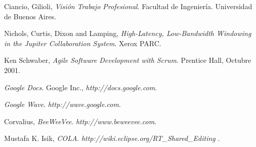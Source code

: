 \documentclass[12pt,a4paper]{article}
\begin{document}
\newpage
\begin{thebibliography}{9}
	Ciancio, Gilioli,
	\emph{Visión Trabajo Profesional}.
	Facultad de Ingeniería.
	Universidad de Buenos Aires. 

	Nichols, Curtis, Dixon and Lamping,
	\emph{High-Latency, Low-Bandwidth Windowing in the Jupiter Collaboration System}.
	Xerox PARC.

	Ken Schwaber,
	\emph{Agile Software Development with Scrum}.
	Prentice Hall, 
	Octubre 2001.
	
	\emph{Google Docs}. 
	Google Inc., 
	\textsl{http://docs.google.com}.
	
	\emph{Google Wave}. 
	\textsl{http://wave.google.com}.

	Corvalius,
	\emph{BeeWeeVee}. 
	\textsl{http://www.beweevee.com}.
	
	Mustafa K. Isik,
	\emph{COLA}. 
	\textsl{ http://wiki.eclipse.org/RT\_Shared\_Editing }.

		
\end{thebibliography}
\end{document}
